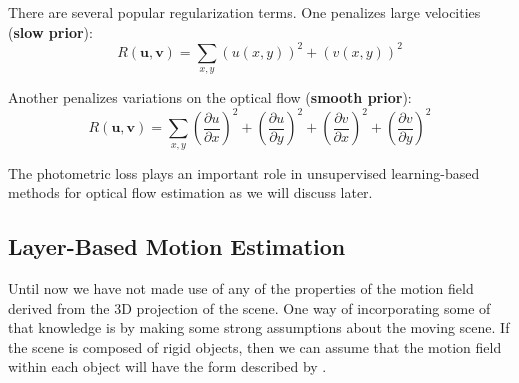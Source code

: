 There are several popular regularization terms. One penalizes large velocities ({\bf slow prior}):
\begin{equation}
    R(\mathbf{u}, \mathbf{v}) =
    \sum_{x,y} \left( u(x,y) \right)^2 +
    \left( v(x,y)  \right)^2
\end{equation}

Another penalizes variations on the optical flow ({\bf smooth prior}):
\begin{equation}
    R(\mathbf{u}, \mathbf{v}) =
    \sum_{x,y} \left( \frac{\partial u}{\partial x}  \right)^2 + \left( \frac{\partial u}{\partial y}  \right)^2 +
    \left( \frac{\partial v}{\partial x}  \right)^2 + \left( \frac{\partial v}{\partial y}  \right)^2
\end{equation}

The photometric loss plays an important role in unsupervised learning-based methods for optical flow estimation as we will discuss later.









\subsection{Layer-Based Motion Estimation}

Until now we have not made use of any of the properties of the motion field derived from the 3D projection of the scene. One way of incorporating some of that knowledge is by making some strong assumptions about the moving scene. If the scene is composed of rigid objects, then we can assume that the motion field within each object will have the form described by \eqn{\ref{eq:2d_motion_field_from_translation_and_rotation}}.

